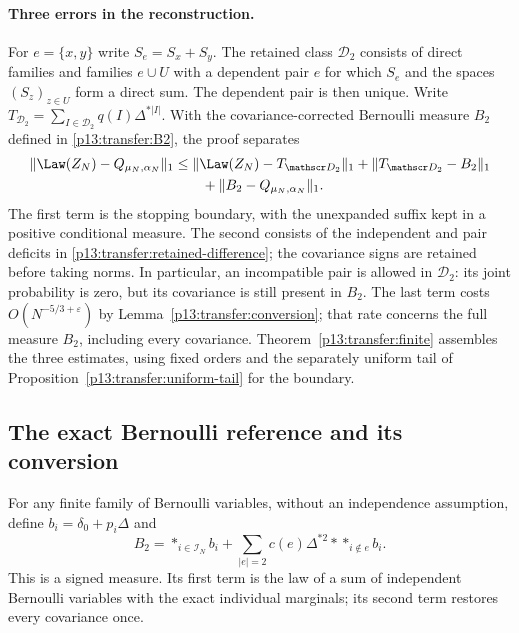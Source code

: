 \paragraph{Three errors in the reconstruction.}
For $e=\{x,y\}$ write $S_e=S_x+S_y$.
The retained class \(\mathscr D_2\) consists of direct families and
families \(e\cup U\) with a dependent pair \(e\) for which
\(S_e\) and the spaces \((S_z)_{z\in U}\) form a direct sum.
The dependent pair is then unique. Write
\(T_{\mathscr D_2}=\sum_{I\in\mathscr D_2}q(I)\Delta^{*|I|}\).
With the covariance-corrected Bernoulli measure \(B_2\) defined in
\eqref{p13:transfer:B2}, the proof separates
\[
 \begin{aligned}
 \|\Law(Z_N)-Q_{\mu_N,\alpha_N}\|_1
 &\le \|\Law(Z_N)-T_{\mathscr D_2}\|_1
       +\|T_{\mathscr D_2}-B_2\|_1\\
 &\qquad +\|B_2-Q_{\mu_N,\alpha_N}\|_1.
 \end{aligned}
\]
The first term is the stopping boundary, with the unexpanded suffix
kept in a positive conditional measure. The second consists of the
independent and pair deficits in
\eqref{p13:transfer:retained-difference}; the covariance signs are
retained before taking norms. In particular, an incompatible pair
is allowed in \(\mathscr D_2\): its joint probability is zero,
but its covariance is still present in \(B_2\).
The last term costs \(O(N^{-5/3+\varepsilon})\) by
Lemma~\ref{p13:transfer:conversion}; that rate concerns the full
measure \(B_2\), including every covariance.
Theorem~\ref{p13:transfer:finite} assembles the three estimates,
using fixed orders and the separately uniform tail of
Proposition~\ref{p13:transfer:uniform-tail} for the boundary.

\subsection{The exact Bernoulli reference and its conversion}

For any finite family of Bernoulli variables, without an independence
assumption, define $b_i=\delta_0+p_i\Delta$ and
\begin{equation}
 B_2=\mathop{*}_{i\in\mathcal I_N}b_i
       +\sum_{|e|=2}c(e)\Delta^{*2}*
                     \mathop{*}_{i\notin e}b_i.
 \label{p13:transfer:B2}
\end{equation}
This is a signed measure. Its first term is the law of a sum of
independent Bernoulli variables with the exact individual marginals;
its second term restores every covariance once.

